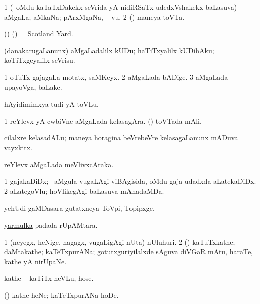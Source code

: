 \bentry
{} 
\gl{\nA}
\bmng
\bnum
\num{1} (\kanmu\ oMdu kaTaTxDakekx seVrida yA nidiRSaTx udedxVshakekx baLasuva) aMgaLa; aMkaNa; pArxMgaNa, \udA\  \mo vu. 
\num{2} (\ame) maneya toVTa.
\enum
\emng

\noindent
\gl{\pagu} 
\bmng
{} (\birx) (\AmA) = \hyperref{kandict_s.pdf}{S}{Scotland Yard}{Scotland Yard}.
\emng 
\eentry

\bentry
{} 
\gl{\sakirx} 
\bmng
(danakarugaLanunx) aMgaLadalilx kUDu;  haTiTxyalilx kUDihAku; koTiTxgeyalilx seVrisu.
\emng
\eentry

\bentry
{} 
\gl{\nA} 
\bmng
\bnum
\num{1} oTuTx gajagaLa motatx, saMKeyx.
\num{2} aMgaLada bADige. 
\num{3} aMgaLada upayoVga, baLake.
\enum
\emng 
\eentry

\bentry
{} 
\gl{\nA} 
\bmng
hAyidimimxya tudi yA toVLu.
\emng 
\eentry

\bentry
{} 
\gl{\nA} 
\bmng
\bnum
\num{1} reYlevx yA cwbiVne  aMgaLada kelasagAra. 
 (\ame) 
\banum
{} toVTada mAli. 

 cilalxre kelasadALu; maneya horagina beVrebeVre kelasagaLanunx mADuva vayxkitx.
\eanum
\numie
\enum
\emng
\eentry

\bentry
{} 
\gl{\nA} 
\bmng
reYlevx aMgaLada meVlivxcAraka.
\emng 
\eentry

\bentry
{} 
\gl{\nA}
\bmng
\bnum
\num{1} gajakaDiDx; \sA\ aMgula \mo vugaLAgi viBAgisida, oMdu gaja udadxda aLatekaDiDx. 
\num{2} aLategoVlu; hoVlikegAgi baLasuva mAnadaMDa.
\enum
\emng
\eentry

\bentry
{} 
\gl{\nA} 
\bmng
yehUdi gaMDasara gutatxneya ToVpi, Topipxge.
\emng
\eentry

\bentry
{} 
\gl{\nA} 
\bmng
\hyperlink{yarmulka}{yarmulka} padada rUpAMtara.
\emng
\eentry

\bentry
{} 
\gl{\nA} 
\bmng
\bnum
\num{1} (neyegx, heNige, hagagx, \mo vugaLigAgi nUta) nUluhuri. 
\num{2} (\AmA) kaTuTxkathe; daMtakathe; kaTeTxpurANa; gotutxguriyilalxde sAguva diVGaR mAtu, haraTe, kathe yA nirUpaNe.
\enum
\emng

\noindent
\gl{\pagu} 
\bmng
{} kathe -- kaTiTx heVLu, hose.
\emng
\eentry


\bentry
{} 
\gl{\akirx}
\bmng
(\AmA) kathe heNe; kaTeTxpurANa hoDe.
\emng
\eentry

